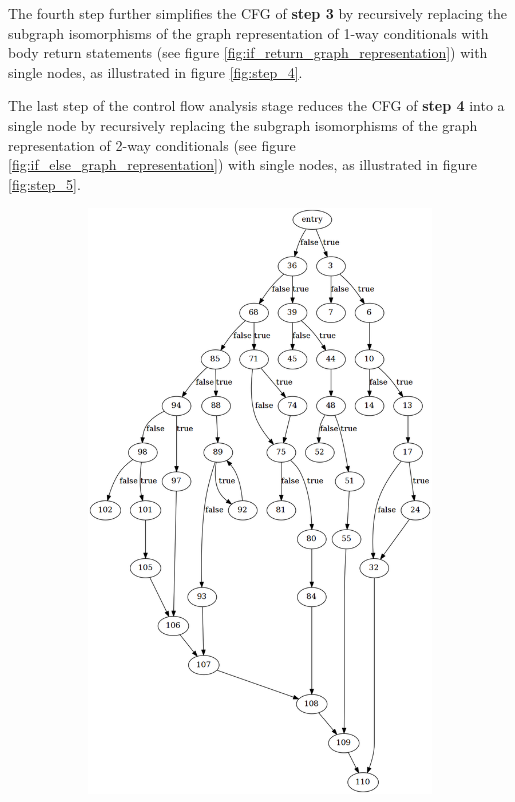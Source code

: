 The fourth step further simplifies the CFG of \textbf{step 3} by recursively replacing the subgraph isomorphisms of the graph representation of 1-way conditionals with body return statements (see figure \ref{fig:if_return_graph_representation}) with single nodes, as illustrated in figure \ref{fig:step_4}.

The last step of the control flow analysis stage reduces the CFG of \textbf{step 4} into a single node by recursively replacing the subgraph isomorphisms of the graph representation of 2-way conditionals (see figure \ref{fig:if_else_graph_representation}) with single nodes, as illustrated in figure \ref{fig:step_5}.

\begin{figure}[htbp]
	\centering
	\begin{subfigure}[ht]{0.45\textwidth}
		\includegraphics[width=\textwidth]{appendices/control_flow_analysis_example/stmt_0.png}

\end{subfigure}
\end{figure}
